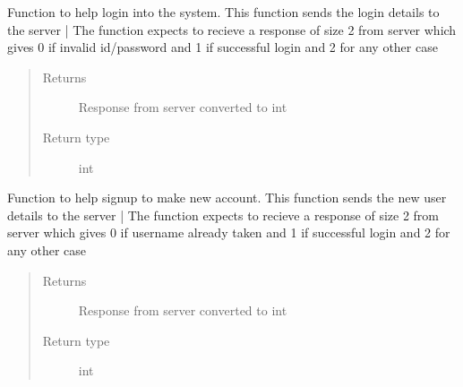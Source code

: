 \documentclass[letterpaper,10pt,english]{sphinxmanual}
\begin{document}
\begin{fulllineitems}
\begin{fulllineitems}
\end{fulllineitems}


\begin{fulllineitems}
\label{\detokenize{Message:Message.Message._login}}
Function to help login into the system. This function sends the login details to the server |
The function expects to recieve a response of size 2 from server which gives 0 if invalid id/password and 1 if successful login and 2 for any other case
\begin{quote}\begin{description}
\item[{Returns}] \leavevmode
Response from server converted to int

\item[{Return type}] \leavevmode
int

\end{description}\end{quote}

\end{fulllineitems}


\begin{fulllineitems}
\label{\detokenize{Message:Message.Message._signup}}
Function to help signup to make new account. This function sends the new user details to the server |
The function expects to recieve a response of size 2 from server which gives 0 if username already taken and 1 if successful login and 2 for any other case
\begin{quote}\begin{description}
\item[{Returns}] \leavevmode
Response from server converted to int

\item[{Return type}] \leavevmode
int

\end{description}\end{quote}

\end{fulllineitems}



\end{fulllineitems}
\end{document}
